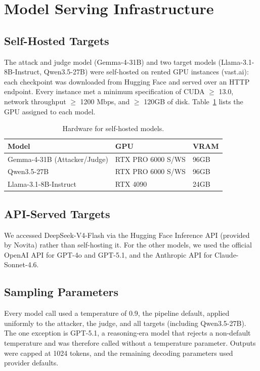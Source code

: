 \section{Model Serving Infrastructure}
\label{app:infra}

\subsection{Self-Hosted Targets}
The attack and judge model (Gemma-4-31B) and two target models (Llama-3.1-8B-Instruct, Qwen3.5-27B) were self-hosted on rented GPU instances (vast.ai): each checkpoint was downloaded from Hugging Face and served over an HTTP endpoint.
Every instance met a minimum specification of CUDA $\ge$ 13.0, network throughput $\ge$ 1200 Mbps, and $\ge$ 120GB of disk.
Table~\ref{tab:serving} lists the GPU assigned to each model.

\begin{table}[htbp]
      \centering
      \caption{Hardware for self-hosted models.}
      \label{tab:serving}
      \footnotesize
      \begin{tabular}{lll}
            \toprule
            \textbf{Model} & \textbf{GPU} & \textbf{VRAM} \\
            \midrule
            Gemma-4-31B (Attacker/Judge) & RTX PRO 6000 S/WS & 96GB \\
            Qwen3.5-27B                  & RTX PRO 6000 S/WS & 96GB \\
            Llama-3.1-8B-Instruct        & RTX 4090          & 24GB \\
            \bottomrule
      \end{tabular}
\end{table}

\subsection{API-Served Targets}
We accessed DeepSeek-V4-Flash via the Hugging Face Inference API (provided by Novita) rather than self-hosting it.
For the other models, we used the official OpenAI API for GPT-4o and GPT-5.1, and the Anthropic API for Claude-Sonnet-4.6.

\subsection{Sampling Parameters}
Every model call used a temperature of 0.9, the pipeline default, applied uniformly to the attacker, the judge, and all targets (including Qwen3.5-27B). The one exception is GPT-5.1, a reasoning-era model that rejects a non-default temperature and was therefore called without a temperature parameter. Outputs were capped at 1024 tokens, and the remaining decoding parameters used provider defaults.

